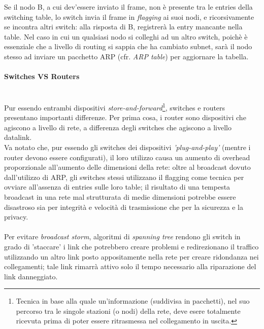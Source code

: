 Se il nodo B, a cui dev'essere inviato il frame, non è presente tra le entries della switching table, lo switch invia il frame in \textit{flagging} ai suoi nodi, e ricorsivamente se incontra altri switch: alla risposta di B, registrerà la entry mancante nella table. Nel caso in cui un qualsiasi nodo si colleghi ad un altro switch, poichè è essenziale che a livello di routing si sappia che ha cambiato subnet, sarà il nodo stesso ad inviare un pacchetto ARP (cfr. \textit{ARP table}) per aggiornare la tabella. \\

\paragraph{Switches VS Routers} \hfill \\
Pur essendo entrambi dispositivi \textit{store-and-forward}\footnote{Tecnica in base alla quale un'informazione (suddivisa in pacchetti), nel suo percorso tra le singole stazioni (o nodi) della rete, deve esere totalmente ricevuta prima di poter essere ritrasmessa nel collegamento in uscita.}, switches e routers presentano importanti differenze. Per prima cosa, i router sono dispositivi che agiscono a livello di rete, a differenza degli switches che agiscono a livello datalink. \\
Va notato che, pur essendo gli switches dei dispositivi \textit{'plug-and-play'} (mentre i router devono essere configurati), il loro utilizzo causa un aumento di overhead proporzionale all'aumento delle dimensioni della rete: oltre al broadcast dovuto dall'utilizzo di ARP, gli switches stessi utilizzano il flagging come tecnica per ovviare all'assenza di entries sulle loro table; il risultato di una tempesta broadcast in una rete mal strutturata di medie dimensioni potrebbe essere disastroso sia per integrità e velocità di trasmissione che per la sicurezza e la privacy.\\\\
Per evitare \textit{broadcast storm}, algoritmi di \textit{spanning tree} rendono gli switch in grado di 'staccare' i link che potrebbero creare problemi e redirezionano il traffico utilizzando un altro link posto appositamente nella rete per creare ridondanza nei collegamenti; tale link rimarrà attivo solo il tempo necessario alla riparazione del link danneggiato.

